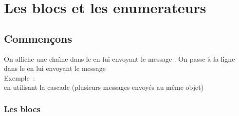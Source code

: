
\ifx\wholebook\relax\else


\fi

\chapter{Les blocs et les enumerateurs}

%



%

\section{Commen\c cons}

On affiche une cha\^{\i}ne dans le  en lui envoyant le
message . On passe \`a la ligne dans le
 en lui envoyant le message \\
Exemple~:
\\
en utilisant la cascade (plusieurs messages envoy\'es au m\^eme objet)\\
 
\subsection{Les blocs}

